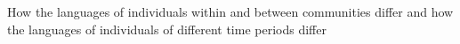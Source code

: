 How the languages of individuals within and between communities differ and how the languages of individuals of different time periods differ
